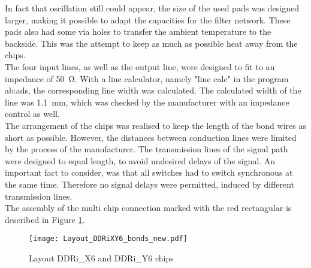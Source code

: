 In fact that oscillation still could appear, the size of the used pads was designed larger, making it possible to adapt the capacities for the filter network.
These pads also had some via holes to transfer the ambient temperature to the backside.
This was the attempt to keep as much as possible heat away from the chips.\\
The four input lines, as well as the output line, were designed to fit to an impedance of \SI{50}{\ohm}.
With a line calculator, namely "line calc" in the program \gls{ab:ads}, the corresponding line width was calculated.
The calculated width of the line was \SI{1.1}{\milli \meter}, which was checked by the manufacturer with an impedance control as well.\\
The arrangement of the chips was realised to keep the length of the bond wires as short as possible.
However, the distances between conduction lines were limited by the process of the manufacturer.
The transmission lines of the signal path were designed to equal length, to avoid undesired delays of the signal.
An important fact to consider, was that all switches had to switch synchronous at the same time. 
Therefore no signal delays were permitted, induced by different transmission lines.\\
The assembly of the multi chip connection marked with the red rectangular is described in Figure \ref{fig:layoutDDRiXY6bond}.

\begin{figure}[htb!]
	\centering
  \texttt{[image: Layout\_DDRiXY6\_bonds\_new.pdf]}
	\caption{Layout DDRi\_X6 and DDRi\_Y6 chips}
	\label{fig:layoutDDRiXY6bond}
\end{figure}

